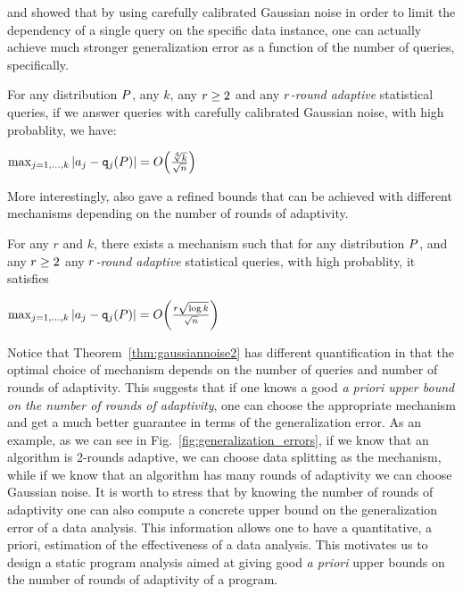\citet{DworkFHPRR15} and \citet{BassilyNSSSU16} showed that by using carefully calibrated Gaussian noise in order to limit the dependency of a single query on the specific data instance, one 
can actually achieve much stronger generalization error as a function of the number of queries, specifically.
\begin{thm} \label{thm:gaussiannoise} For any distribution $P$, any $k$, any $r \geq 2$ and any \emph{$r$-round adaptive} statistical queries, if we answer queries with carefully calibrated Gaussian noise, with high probablity,  we have:
\begin{center}
  $
\max_{j=1,\dots,k} | \answer_j - \qquery_j(\dist) | = O\left( \frac{\sqrt[4]{k}}{\sqrt{n}}  \right)
$  
\end{center}
\end{thm}
More interestingly, \citet{DworkFHPRR15}
also gave a refined bounds that can be achieved with different mechanisms depending on the number of rounds of adaptivity.   \begin{thm} \label{thm:gaussiannoise2} For any $r$ and $k$, there exists a mechanism such that for any distribution $P$, and any $r \geq 2$ any \emph{$r$-round adaptive} statistical queries, with high probablity, it satisfies
\begin{center}
  $
\max_{j=1,\dots,k} | \answer_j - \qquery_j(\dist) | = O\left( \frac{r \sqrt{\log k}}{\sqrt{n}}  \right)
$  
\end{center}
\end{thm}
Notice that Theorem~\ref{thm:gaussiannoise2} has different quantification in that the optimal choice of mechanism depends on the number of queries {and number of rounds of adaptivity}.  This suggests that if one knows a good \emph{a priori upper bound on the number of rounds of adaptivity}, one can choose the appropriate mechanism and get a much better guarantee in terms of the generalization error.
As an example, as we can see in Fig.~\ref{fig:generalization_errors}, if we know that an algorithm is 2-rounds adaptive, we can choose data splitting as {the} mechanism, while if we know that an algorithm has many rounds of adaptivity we can choose Gaussian noise. It is worth to stress that by knowing the number of rounds of adaptivity one can also compute a concrete upper bound on the generalization error of a data analysis. This information allows one to have a quantitative, a priori, estimation of the effectiveness of a data analysis. 
This motivates us to design a static program analysis aimed at giving good \emph{a priori} upper bounds on the number of rounds of adaptivity of a program. 

